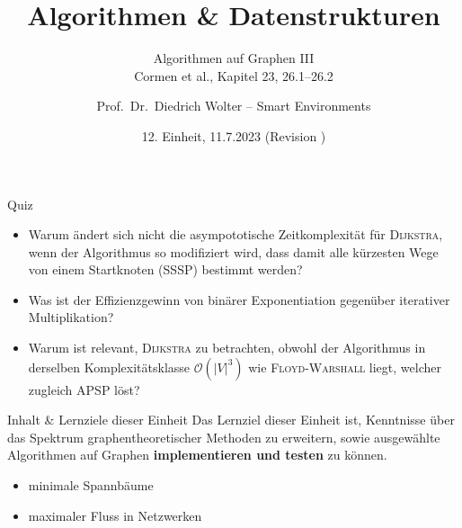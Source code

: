 \documentclass{vorlesung}
\title[\textcolor{black}{AuD}]{Algorithmen \& Datenstrukturen}
\subtitle[\textcolor{black}{Graphalgorithmen}]{Algorithmen auf Graphen III{\\ \normalsize\hspace*{0.1em}Cormen et al., Kapitel 23, 26.1--26.2}}
\date[2023]{12. Einheit, 11.7.2023 {\scriptsize (Revision \gitAuthorIsoDate)}}
\author[Prof.~Wolter u.a.]{Prof.\ Dr.\ Diedrich Wolter -- Smart Environments}
\newcommand{\mrk}[1]{\textcolor{ubrot}{\bfseries #1}}
\newcommand{\ovon}[1]{\ensuremath{\mathcal{O}(#1)}}
\begin{document}
\lstset{style=customjava}
\begin{frame}
\titlepage
\end{frame}
%
\begin{frame}{Quiz}
\begin{itemize}
	\item Warum ändert sich nicht die asympototische Zeitkomplexität für \textsc{Dijkstra}, wenn der Algorithmus so modifiziert wird, dass damit alle kürzesten Wege von einem Startknoten (SSSP) bestimmt werden? 
	\item Was ist der Effizienzgewinn von binärer Exponentiation gegenüber iterativer Multiplikation? 
	\item Warum ist relevant, \textsc{Dijkstra} zu betrachten, obwohl der Algorithmus in derselben Komplexitätsklasse \ovon{|V|^3} wie \textsc{Floyd-Warshall} liegt, welcher zugleich APSP löst?
\end{itemize}
\end{frame}
%
\begin{frame}{Inhalt \& Lernziele dieser Einheit}
Das Lernziel dieser Einheit ist, Kenntnisse über das Spektrum graphentheoretischer Methoden zu erweitern, 
sowie ausgewählte Algorithmen auf Graphen \mrk{implementieren und testen} zu können. 
\begin{itemize}
	\item minimale Spannbäume
	\item maximaler Fluss in Netzwerken
\end{itemize}
\end{frame}
%
%
\end{document}
